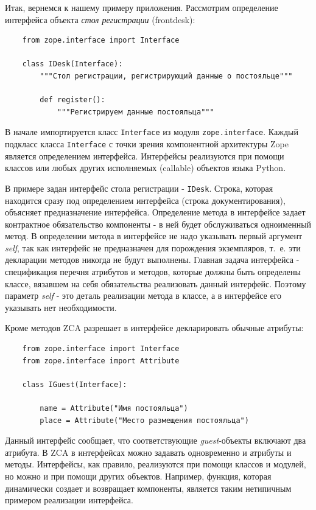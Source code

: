 \documentclass[a4paper,openany,twoside,draft]{book}
\providecommand*{\DUroletitlereference}[1]{\textsl{#1}}
\begin{document}
Итак, вернемся к нашему примеру приложения.  Рассмотрим определение интерфейса объекта \DUroletitlereference{стол регистрации} (frontdesk):

\begin{verbatim}
    from zope.interface import Interface

    class IDesk(Interface):
        """Стол регистрации, регистрирующий данные о постояльце"""

        def register():
            """Регистрируем данные постояльца"""

\end{verbatim}

В начале импортируется класс \texttt{Interface} из модуля \texttt{zope.interface}.  Каждый подкласс класса \texttt{Interface} с точки зрения компонентной архитектуры Zope является определением интерфейса.  Интерфейсы реализуются при помощи классов или любых других исполняемых (callable) объектов языка Python.

В примере задан интерфейс стола регистрации - \texttt{IDesk}.  Строка, которая находится сразу под определением интерфейса (строка документирования), объясняет предназначение интерфейса.  Определение метода в интерфейсе задает контрактное обязательство компоненты - в ней будет обслуживаться одноименный метод.  В определении метода в интерфейсе не надо указывать первый аргумент \DUroletitlereference{self}, так как интерфейс не предназначен для порождения экземпляров, т.~е. эти декларации методов никогда не будут выполнены.  Главная задача интерфейса - спецификация перечня атрибутов и методов, которые должны быть определены классе, вязавшем на себя обязательства реализовать данный интерфейс.  Поэтому параметр \DUroletitlereference{self} - это деталь реализации метода в классе, а в интерфейсе его указывать нет необходимости.

Кроме методов ZCA разрешает в интерфейсе декларировать обычные атрибуты:

\begin{verbatim}
    from zope.interface import Interface
    from zope.interface import Attribute

    class IGuest(Interface):

        name = Attribute("Имя постояльца")
        place = Attribute("Место размещения постояльца")
\end{verbatim}

Данный интерфейс сообщает, что соответствующие \DUroletitlereference{guest}-объекты включают два атрибута.  В ZCA в интерфейсах можно задавать одновременно и атрибуты и методы.  Интерфейсы, как правило, реализуются при помощи классов и модулей, но можно и при помощи других объектов.  Например, функция, которая динамически создает и возвращает компоненты, является таким нетипичным примером реализации интерфейса.
\end{document}
